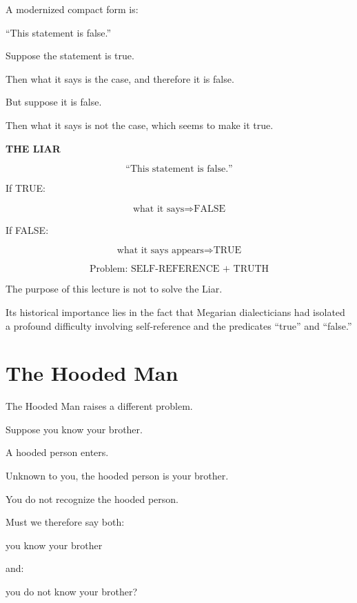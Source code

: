 \documentclass[11pt]{article}
\begin{document}
A modernized compact form is:

\begin{center}
``This statement is false.''
\end{center}

Suppose the statement is true.

Then what it says is the case, and therefore it is false.

But suppose it is false.

Then what it says is not the case, which seems to make it true.

\begin{whiteboard}
\textbf{THE LIAR}

\[
\text{``This statement is false.''}
\]

If TRUE:

\[
\text{what it says} \Rightarrow \text{FALSE}
\]

If FALSE:

\[
\text{what it says appears} \Rightarrow \text{TRUE}
\]

\[
\boxed{\text{Problem: SELF-REFERENCE + TRUTH}}
\]
\end{whiteboard}

The purpose of this lecture is not to solve the Liar.

Its historical importance lies in the fact that Megarian
dialecticians had isolated a profound difficulty involving
self-reference and the predicates ``true'' and ``false.''

\section{The Hooded Man}

The Hooded Man raises a different problem.

Suppose you know your brother.

A hooded person enters.

Unknown to you, the hooded person is your brother.

You do not recognize the hooded person.

Must we therefore say both:

\begin{center}
you know your brother
\end{center}

and:

\begin{center}
you do not know your brother?
\end{center}
\end{document}
